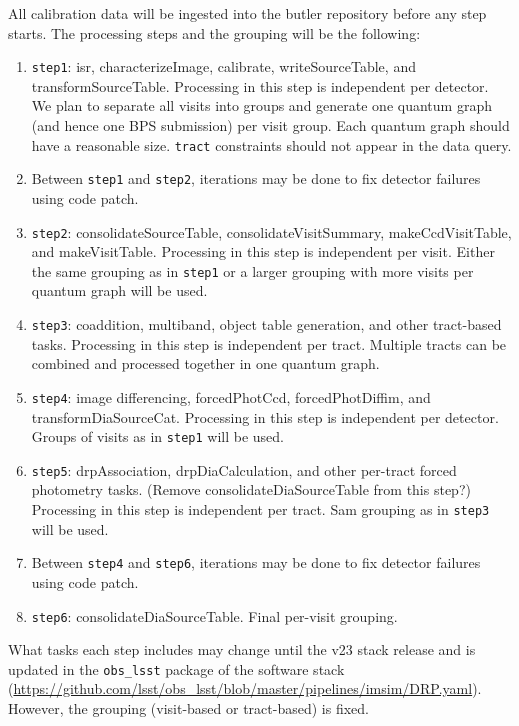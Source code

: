 All calibration data will be ingested into the butler repository before any step starts.
The processing steps and the grouping will be the following:
\begin{enumerate}
  \item \texttt{step1}: isr, characterizeImage, calibrate, writeSourceTable, and transformSourceTable. Processing in this step is independent per detector. We plan to separate all visits into groups and generate one quantum graph (and hence one BPS submission) per visit group. Each quantum graph should have a reasonable size.
\texttt{tract} constraints should not appear in the data query.
  \item Between \texttt{step1} and \texttt{step2}, iterations may be done to fix detector failures using code patch.
  \item \texttt{step2}: consolidateSourceTable, consolidateVisitSummary, makeCcdVisitTable, and makeVisitTable. Processing in this step is independent per visit. Either the same grouping as in \texttt{step1} or a larger grouping with more visits per quantum graph will be used.
  \item \texttt{step3}: coaddition, multiband, object table generation, and other tract-based tasks. Processing in this step is independent per tract. Multiple tracts can be combined and processed together in one quantum graph.
  \item \texttt{step4}: image differencing, forcedPhotCcd, forcedPhotDiffim, and transformDiaSourceCat. Processing in this step is independent per detector. Groups of visits as in \texttt{step1} will be used.
  \item \texttt{step5}: drpAssociation, drpDiaCalculation, and other per-tract forced photometry tasks.
(Remove consolidateDiaSourceTable from this step?)
Processing in this step is independent per tract.
Sam grouping as in \texttt{step3} will be used.
  \item Between \texttt{step4} and \texttt{step6}, iterations may be done to fix detector failures using code patch.
  \item \texttt{step6}: consolidateDiaSourceTable. Final per-visit grouping.
\end{enumerate}

What tasks each step includes may change until the v23 stack release and is updated in the \texttt{obs\_lsst} package of the software stack (\url{https://github.com/lsst/obs_lsst/blob/master/pipelines/imsim/DRP.yaml}).
However, the grouping (visit-based or tract-based) is fixed.

